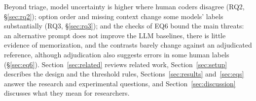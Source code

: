 Beyond triage, model uncertainty is higher where human coders disagree (RQ2, \S\ref{sec:rq2}); option order and missing
context change some models' labels substantially (RQ3, \S\ref{sec:rq3}); and the checks of EQ6 bound the main threats: an
alternative prompt does not improve the LLM baselines, there is little evidence of memorization, and the contrasts barely
change against an adjudicated reference, although adjudication also suggests errors in some human labels
(\S\ref{sec:eq6}). Section~\ref{sec:related} reviews related work, Section~\ref{sec:setup} describes the
design and the threshold rules, Sections~\ref{sec:results} and~\ref{sec:eqs} answer the research and experimental questions,
and Section~\ref{sec:discussion} discusses what they mean for researchers.

